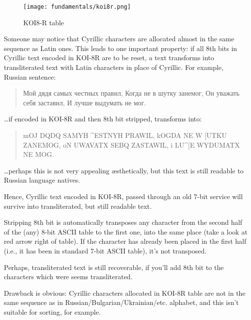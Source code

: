 \begin{figure}[H]
\centering
\texttt{[image: fundamentals/koi8r.png]}
\caption{KOI8-R table}
\end{figure}

Someone may notice that Cyrillic characters are allocated almost in the same sequence as Latin ones.
This leads to one important property: if all 8th bits in Cyrillic text encoded in KOI-8R are to be reset,
a text transforms into transliterated text with Latin characters in place of Cyrillic.
For example, Russian sentence:

\begin{framed}
\begin{quotation}
Мой дядя самых честных правил, Когда не в шутку занемог, Он уважать себя заставил, И лучше выдумать не мог.
\end{quotation}
\end{framed}

\dots if encoded in KOI-8R and then 8th bit stripped, transforms into:

\begin{framed}
\begin{quotation}
mOJ DQDQ SAMYH \^{}ESTNYH PRAWIL, kOGDA NE W [UTKU ZANEMOG, oN UWAVATX SEBQ ZASTAWIL, i LU\^{}[E WYDUMATX NE MOG.
\end{quotation}
\end{framed}

\dots perhaps this is not very appealing \ae{}sthetically, but this text is still readable to Russian language natives.

Hence, Cyrillic text encoded in KOI-8R, passed through an old 7-bit service will survive into transliterated, but still
readable text.

Stripping 8th bit is automatically transposes any character from the second half of
the (any) 8-bit \ac{ASCII} table to the first one, into the same place (take a look at red arrow right of table).
If the character has already been placed in the first half (i.e., it has been in standard 7-bit \ac{ASCII} table), it's not transposed.

Perhaps, transliterated text is still recoverable, if you'll add 8th bit to the characters which were seems
transliterated.

Drawback is obvious: Cyrillic characters allocated in KOI-8R table are not in the same sequence as
in Russian/Bulgarian/Ukrainian/etc. alphabet, and this isn't suitable for sorting, for example.

